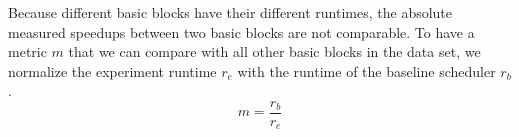 Because different basic blocks have their different runtimes, the absolute measured speedups between two basic blocks are not comparable.
To have a metric $m$ that we can compare with all other basic blocks in the data set, we normalize the experiment runtime $r_e$ with the runtime of the baseline scheduler $r_b$.
\begin{equation}
    m=\frac{r_b}{r_e}
    \label{eqn:approach:mcts-score}
\end{equation}
